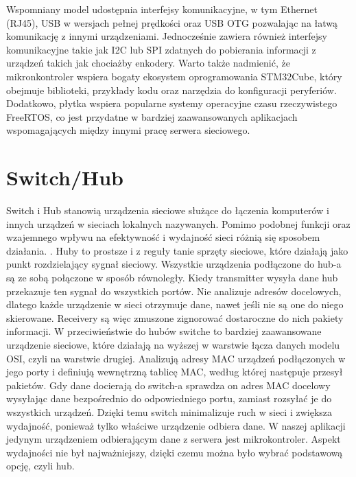 \noindent Wspomniany model udostępnia interfejsy komunikacyjne, w tym Ethernet (RJ45), USB w wersjach pełnej prędkości oraz USB OTG pozwalając na łatwą komunikację z innymi urządzeniami. Jednocześnie zawiera również interfejsy komunikacyjne takie jak I2C lub SPI zdatnych do pobierania informacji z urządzeń takich jak chociażby enkodery. \newline
\noindent Warto także nadmienić, że mikronkontroler wspiera bogaty ekosystem oprogramowania STM32Cube, który obejmuje biblioteki, przykłady kodu oraz narzędzia do konfiguracji peryferiów. Dodatkowo, płytka wspiera popularne systemy operacyjne czasu rzeczywistego FreeRTOS, co jest przydatne w bardziej zaawansowanych aplikacjach wspomagających między innymi pracę serwera sieciowego.


\section{Switch/Hub}
Switch i Hub stanowią urządzenia sieciowe służące do łączenia komputerów i innych urządzeń w sieciach lokalnych nazywanych. Pomimo podobnej funkcji oraz wzajemnego wpływu na efektywność i wydajność sieci różnią się sposobem działania. \cite{net}.\newline
\noindent Huby to prostsze i z reguły tanie sprzęty sieciowe, które działają jako punkt rozdzielający sygnał sieciowy. Wszystkie urządzenia podłączone do hub-a są ze sobą połączone w sposób równoległy. Kiedy transmitter wysyła dane hub przekazuje ten sygnał do wszystkich portów. Nie analizuje adresów docelowych, dlatego każde urządzenie w sieci otrzymuje dane, nawet jeśli nie są one do niego skierowane. Receivery są więc zmuszone zignorować dostaroczne do nich pakiety informacji. \newline
\noindent W przeciwieństwie do hubów switche to bardziej zaawansowane urządzenie sieciowe, które działają na wyższej w warstwie łącza danych modelu OSI, czyli na warstwie drugiej. Analizują adresy MAC urządzeń podłączonych w jego porty i definiują wewnętrzną tablicę MAC, według której następuje przesył pakietów. Gdy dane docierają do switch-a sprawdza on adres MAC docelowy wysyłając dane bezpośrednio do odpowiedniego portu, zamiast rozsyłać je do wszystkich urządzeń. Dzięki temu switch minimalizuje ruch w sieci i zwiększa wydajność, ponieważ tylko właściwe urządzenie odbiera dane. \newline
\noindent W naszej aplikacji jedynym urządzeniem odbierającym dane z serwera jest mikrokontroler. Aspekt wydajności nie był najważniejszy, dzięki czemu można było wybrać podstawową opcję, czyli hub. 

\newpage 